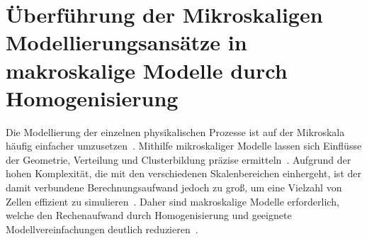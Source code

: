 \section{\label{sec:homogenisation}Überführung der Mikroskaligen Modellierungsansätze in makroskalige Modelle durch Homogenisierung}

Die Modellierung der einzelnen physikalischen Prozesse ist auf der Mikroskala häufig einfacher umzusetzen~\cite{Plett2015}. Mithilfe mikroskaliger Modelle lassen sich Einflüsse der Geometrie, Verteilung und Clusterbildung präzise ermitteln~\cite{Newman2021}. Aufgrund der hohen Komplexität, die mit den verschiedenen Skalenbereichen einhergeht, ist der damit verbundene Berechnungsaufwand jedoch zu groß, um eine Vielzahl von Zellen effizient zu simulieren~\cite{Liu2019}. Daher sind makroskalige Modelle erforderlich, welche den Rechenaufwand durch Homogenisierung und geeignete Modellvereinfachungen deutlich reduzieren~\cite{Plett2015}.

